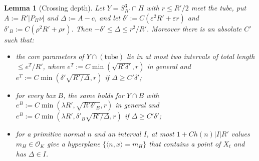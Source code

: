 \documentclass[aps,prx,twocolumn,superscriptaddress,nofootinbib,longbibliography]{revtex4-2}
\theoremstyle{plain}
\newtheorem{lemma}{Lemma}
\theoremstyle{definition}
\theoremstyle{remark}
\begin{document}
\begin{lemma}[Crossing depth]\label{lem:F4}
Let $Y=S^3_{R'}\cap H$ with $r\le R'/2$ meet the tube, put $A:=R'|P_\Pi\nu|$ and $\Delta:=A-c$, and let $\delta':=C(\varepsilon^2R'+\varepsilon r)$ and $\delta'_B:=C(\rho^2R'+\rho r)$. Then $-\delta'\le\Delta\le r^2/R'$. Moreover there is an absolute $C'$ such that:
\begin{itemize}\setlength\itemsep{0pt}
\item[(i)] the core parameters of $Y\cap(\text{tube})$ lie in at most two intervals of total length $\le e^T/R'$, where $e^T:=C\min(\sqrt{R'\delta'},r)$ in general and $e^T:=C\min(\delta'\sqrt{R'/\Delta},r)$ if $\Delta\ge C'\delta'$;
\item[(ii)] for every box $B$, the same holds for $Y\cap B$ with $e^B:=C\min(\lambda R',\sqrt{R'\delta'_B},r)$ in general and $e^B:=C\min(\lambda R',\delta'_B\sqrt{R'/\Delta},r)$ if $\Delta\ge C'\delta'$;
\item[(iii)] for a primitive normal $n$ and an interval $I$, at most $1+Ch(n)|I|R'$ values $m_H\in\mathcal O_K$ give a hyperplane $\{\langle n,x\rangle=m_H\}$ that contains a point of $X_t$ and has $\Delta\in I$.
\end{itemize}
\end{lemma}
\end{document}

